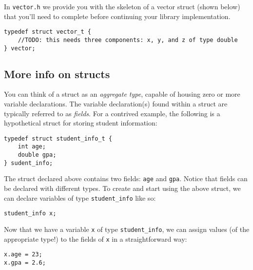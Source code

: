 \documentclass[12pt]{article}
\begin{document}
In \texttt{vector.h} we provide you with the skeleton of a vector struct (shown below) that you'll need to complete before continuing your library implementation.

\begin{mdframed}[backgroundcolor=light-gray, innerleftmargin=10, innertopmargin=1,innerbottommargin=1,linecolor=light-gray]
\begin{lstlisting}
typedef struct vector_t {
    //TODO: this needs three components: x, y, and z of type double
} vector;
\end{lstlisting}
\end{mdframed} 

\subsection{More info on structs}

You can think of a struct as an \textit{aggregate type}, capable of housing zero or more variable declarations. The variable declaration(s) found within a struct are typically referred to as \textit{fields}. For a contrived example, the following is a hypothetical struct for storing student information:

\begin{mdframed}[backgroundcolor=light-gray, innerleftmargin=10, innertopmargin=1,innerbottommargin=1,linecolor=light-gray]
\begin{lstlisting}
typedef struct student_info_t {
    int age;
    double gpa;
} sudent_info;
\end{lstlisting}
\end{mdframed} 

The struct declared above contains two fields: \texttt{age} and \texttt{gpa}. Notice that fields can be  declared with different types. To create and start using the above struct, we can declare variables of type \texttt{student\_info} like so:
\begin{mdframed}[backgroundcolor=light-gray, innerleftmargin=10, innertopmargin=1,innerbottommargin=1,linecolor=light-gray]
\begin{lstlisting}
student_info x;
\end{lstlisting}
\end{mdframed} 
Now that we have a variable \texttt{x} of type \texttt{student\_info}, we can assign values (of the appropriate type!) to the fields of \texttt{x} in a straightforward way:

\begin{mdframed}[backgroundcolor=light-gray, innerleftmargin=10, innertopmargin=1,innerbottommargin=1,linecolor=light-gray]
\begin{lstlisting}
x.age = 23;
x.gpa = 2.6;
\end{lstlisting}
\end{mdframed}
\end{document}
